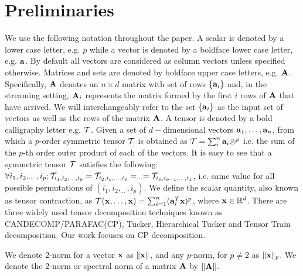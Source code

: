 \section{Preliminaries}{\label{sec:prelimnary}}
We use the following notation throughout the paper. A scalar is denoted by a lower case letter, e.g. $p$ while a vector is denoted by a boldface lower case letter, e.g. $\mathbf{a}$. 
By default all vectors are considered as column vectors unless specified otherwise. Matrices and sets are denoted by boldface upper case letters, e.g. $\mathbf{A}$. %
Specifically, $\mathbf{A}$ denotes an $n\times d$ matrix
with set of rows $\{\mathbf{a}_{i}\}$ and, in the streaming setting, $\mathbf{A}_{i}$ represents the matrix formed by the first $i$ rows of $\mathbf{A}$ that have arrived. We will interchangeably refer to the set $\{\mathbf{a}_i\}$ as the input set of vectors as well as the rows of the matrix $\mathbf{A}$. A tensor is denoted by a bold calligraphy letter e.g. $\mathbf{\mathcal{T}}$. Given a set of $d-$dimensional vectors $\mathbf{a}_1, \ldots, \mathbf{a}_n$, from which a $p$-order symmetric tensor $\mathbf{\mathcal{T}}$ is obtained as
$ \mathbf{\mathcal{T}} = \sum_i^n \mathbf{a}_i \otimes^{p}$ 
i.e. the sum of the $p$-th order outer product of each of the vectors. It is easy to see that a symmetric tensor $\mathbf{\mathcal{T}}$ satisfies
the following: $\forall i_{1},i_{2},_{\cdots},i_{p}; \mathbf{\mathcal{T}}_{i_{1},i_{2},_{\cdots},i_{p}} = \mathbf{\mathcal{T}}_{i_{2},i_{1},_{\cdots},i_{p}} = _{\cdots} = \mathbf{\mathcal{T}}_{i_{p},i_{p-1},_{\cdots},i_{1}}$, i.e. same value for all possible permutations of $(i_1, i_2, _{\cdots}, i_p)$. We define the scalar quantity, also known as tensor contraction, as $\mathbf{\mathcal{T}}(\mathbf{x},\ldots,\mathbf{x}) = \sum_{i=1}^{n}(\mathbf{a}_i^T\mathbf{x})^p$, where $\mathbf{x} \in \mathbb{R}^{d}$. There are three widely used tensor decomposition techniques known as CANDECOMP/PARAFAC(CP), Tucker, Hierarchical Tucker and Tensor Train decomposition. Our work focuses on CP decomposition. 

We denote 2-norm for a vector $\mathbf{x}$ as $\|\mathbf{x}\|$, and any $p$-norm, for $p\neq 2$ as $\|\mathbf{x}\|_p$. We denote the 2-norm or spectral norm of a matrix $\mathbf{A}$ by $\|\mathbf{A}\|$.
% 
